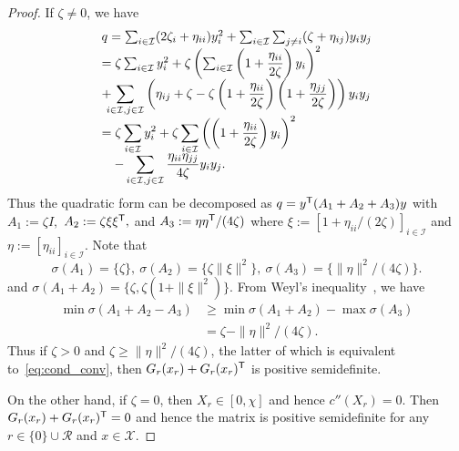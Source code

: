 \documentclass[letterpaper, 10 pt, conference]{ieeeconf}  %
\newcommand{\mc}[1]{\mathcal{#1}}
\begin{document}
\begin{proof}
If $\zeta\neq 0$, we have
\[
 \begin{array}{l}
 q =\sum_{i \in \mc{I}}(2\zeta_i+\eta_{ii})y^2_i+\sum_{i \in \mc{I}} \sum_{j\neq i}(\zeta+\eta_{ij})y_iy_j\\
 = \zeta \sum_{i \in \mc{I}}y^2_i + \zeta\left(\sum_{i \in \mc{I}}
    \left(
     1+\dfrac{\eta_{ii}}{2\zeta}
    \right)y_i
   \right)^2\\
  \displaystyle{
   + \hspace{-2mm} \sum_{i \in \mc{I},j\in\mc{I}}\left(\eta_{ij}+\zeta-\zeta
  \left(1+\dfrac{\eta_{ii}}{2\zeta} \right)\left(1+\dfrac{\eta_{jj}}{2\zeta} \right)
  \right)y_iy_j
  }\\
  \displaystyle{
   = \zeta \sum_{i \in \mc{I}}y^2_i + \zeta
  \sum_{i \in \mc{I}}
  \left(
   \left(1+\dfrac{\eta_{ii}}{2\zeta}\right) y_i
  \right)^2
  }\\
  \displaystyle{
   \quad  - \sum_{i \in \mc{I},j\in\mc{I}} \dfrac{\eta_{ii}\eta_{jj}}{4\zeta}y_iy_j.
  }
 \end{array}
\]
Thus the quadratic form can be decomposed as $q = y^{\sf T}(A_1+A_2+A_3)y$
with $A_1:=\zeta I,$ $A_2:=\zeta\xi\xi^{\sf T},$ and $A_3:= \eta\eta^{\sf T}/(4\zeta)$
where $\xi:=[1+\eta_{ii}/(2\zeta)]_{i \in \mc{I}}$ and $\eta:=[\eta_{ii}]_{i \in \mc{I}}.$
Note that
\[
 \sigma(A_1)=\{\zeta\},\ \sigma(A_2)=\{\zeta\|\xi\|^2\},\ \sigma(A_3)=\{\|\eta\|^2/(4\zeta)\}.
\]
and $\sigma(A_1+A_2)=\{\zeta,\zeta(1+\|\xi\|^2)\}.$
From Weyl's inequality~\cite[Theorem 4.3.1]{Horn2012Matrix}, we have
\[
\begin{array}{ll}
 \min \sigma(A_1+A_2-A_3) & \geq \min \sigma(A_1+A_2)-\max\sigma(A_3)\\
  & = \zeta -\|\eta\|^2/(4\zeta).
\end{array}
\]
Thus if $\zeta>0$ and $\zeta\geq\|\eta\|^2/(4\zeta)$, the latter of which is equivalent to~\eqref{eq:cond_conv}, then $G_r(x_r)+G_r(x_r)^{\sf T}$ is positive semidefinite.

On the other hand, if $\zeta=0$, then $X_r\in[0,\chi]$ and hence $c''(X_r)=0$.
Then $G_r(x_r)+G_r(x_r)^{\sf T}=0$ and hence the matrix is positive semidefinite for any $r\in\{0\}\cup\mc{R}$ and $x\in\mc{X}$.


\end{proof}
\end{document}
